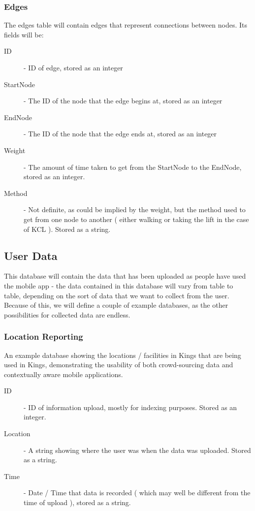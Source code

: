 \documentclass[11pt]{informatics-report}
\begin{document}
\subsubsection{Edges}

The edges table will contain edges that represent connections between nodes. Its fields will be:

\begin{description}
\item[ID] - ID of edge, stored as an integer
\item[StartNode] - The ID of the node that the edge begins at, stored as an integer
\item[EndNode] - The ID of the node that the edge ends at, stored as an integer
\item[Weight] - The amount of time taken to get from the StartNode to the EndNode, stored as an integer.
\item[Method] - Not definite, as could be implied by the weight, but the method used to get from one node to another ( either walking or taking the lift in the case of KCL ). Stored as a string. 
\end{description}

\subsection{User Data}

This database will contain the data that has been uploaded as people have used the mobile app - the data contained in this database will vary from table to table, depending on the sort of data that we want to collect from the user. Because of this, we will define a couple of example databases, as the other possibilities for collected data are endless. 

\subsubsection{Location Reporting}

An example database showing the locations / facilities in Kings that are being used in Kings, demonstrating the usability of both crowd-sourcing data and contextually aware mobile applications. 

\begin{description}
\item[ID] - ID of information upload, mostly for indexing purposes. Stored as an integer.
\item[Location] - A string showing where the user was when the data was uploaded. Stored as a string.
\item[Time] - Date / Time that data is recorded ( which may well be different from the time of upload ), stored as a string.
\end{description}
\newpage
\end{document}
